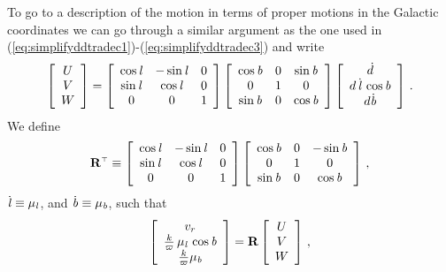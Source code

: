 To go to a description of the motion in terms of proper motions in the
Galactic coordinates we can go through a similar argument as the one
used in (\ref{eq:simplifyddtradec1})-(\ref{eq:simplifyddtradec3}) and
write
\begin{equation}
\left[ \begin{array}{c} U \\ V \\ W \end{array} \right] =
\left[ \begin{array}{ccc} \cos {\it l} & -\sin {\it l} & 0 \\ \sin {\it l} & \cos {\it l} & 0 \\ 0 & 0 & 1 \end{array} \right]
\left[ \begin{array}{ccc} \cos {\it b} & 0 & \sin {\it b}\\ 0 & 1 & 0 \\ \sin {\it b}  & 0 & \cos{\it b}\end{array} \right]
\left[ \begin{array}{c} \dot{d} \\ d\,\dot{{\it l}}\,\cos{\it b}\\d\dot{{\it b}}\end{array} \right]\, .
\end{equation}
We define
\begin{equation}
\mathbf{R}^{\scriptscriptstyle \top} \equiv \left[ \begin{array}{ccc} \cos {\it l} & -\sin {\it l} & 0 \\ \sin {\it l} & \cos {\it l} & 0 \\ 0 & 0 & 1 \end{array} \right]
\left[ \begin{array}{ccc} \cos {\it b} & 0 & -\sin {\it b}\\ 0 & 1 & 0 \\ \sin {\it b}  & 0 & \cos{\it b}\end{array} \right]\, ,
\end{equation}
$\dot{{\it l}} \equiv \mu_{\it l}$, and $\dot{{\it b}} \equiv \mu_{\it b}$, such that
\begin{equation}\label{eq:vrpmllpmbbtoUVW}
\left[ \begin{array}{c} v_r  \\ \frac{k}{\varpi}\,\mu_{\it l}\,\cos{\it b}\\\frac{k}{\varpi}\mu_{\it b}\end{array} \right] = 
\mathbf{R} \left[ \begin{array}{c} U \\ V \\ W \end{array} \right]\, ,
\end{equation}
